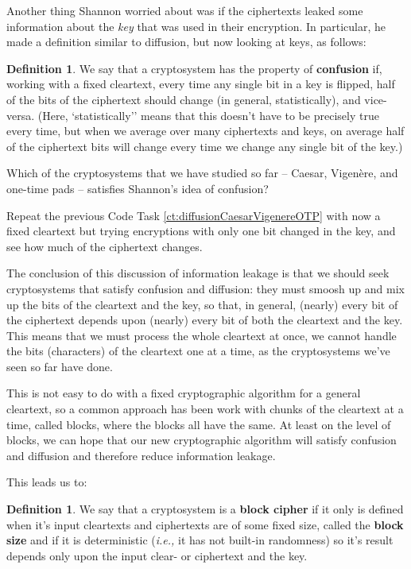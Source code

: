 \documentclass[12pt,letterpaper]{amsbook}
\theoremstyle{definition}
\newtheorem{definition}[theorem]{Definition}
\theoremstyle{remark}
\numberwithin{figure}{section}
\numberwithin{exercise}{chapter}
\numberwithin{section}{chapter}
\numberwithin{equation}{section}
\numberwithin{table}{subsection}
\newcommand{\ix}[1]{{#1}\index{#1}}
\begin{document}
Another thing Shannon worried about was if the
ciphertexts leaked some information about the \textit{key} that was used in
their encryption.  In particular, he made a definition similar to diffusion,
but now looking at keys, as follows:
\begin{definition}\label{def:confusion}
We say that a cryptosystem has the property of \textbf{confusion} if, working
with a fixed cleartext, every time any single bit in a key is flipped,
half of the bits of the ciphertext should change (in general, statistically),
and vice-versa.  (Here, `statistically'' means that this doesn't have to be
precisely true every time, but when we average over many ciphertexts and keys,
on average half of the ciphertext bits will change every time we change any
single bit of the key.)
\end{definition}

\begin{CTtcb}[label=ct:confusionCaesarVigenereOTP]{}{}
 Which of the cryptosystems that we have studied so far --
 Caesar, Vigen\`ere, and
 \ix{one-time pad}s -- satisfies
 Shannon's idea of \ix{confusion}?

 Repeat the previous Code Task \ref{ct:diffusionCaesarVigenereOTP} with now a
 fixed cleartext but trying  encryptions with only one bit changed in the
 key, and see how much of the ciphertext changes.
\end{CTtcb}

The conclusion of this discussion of information leakage is that we should
seek cryptosystems that satisfy confusion and diffusion: they must smoosh up
and mix up the bits of the cleartext and the key, so that, in general,
(nearly) every bit of the ciphertext depends upon (nearly) every bit of both
the cleartext and the key.  This means that we must process the whole
cleartext at once, we cannot handle the bits (characters) of the cleartext
one at a time, as the cryptosystems we've seen so far have done.

This is not easy to do with a fixed cryptographic algorithm for a general
cleartext, so a common approach has been work with chunks of the cleartext
at a time, called blocks, where the blocks all have the same.  At least on
the level of blocks, we can hope that our new cryptographic algorithm will
satisfy confusion and diffusion and therefore reduce information leakage.

This leads us to:
\begin{definition}\label{def:blockcipher}
We say that a cryptosystem is a \textbf{block cipher} if it only is defined
when it's input cleartexts and ciphertexts are of some fixed size, called
the \textbf{block size} and if it is deterministic (\textit{i.e.,} it has
not built-in randomness) so it's result depends only upon the input clear-
or ciphertext and the key.
\end{definition}
\end{document}
